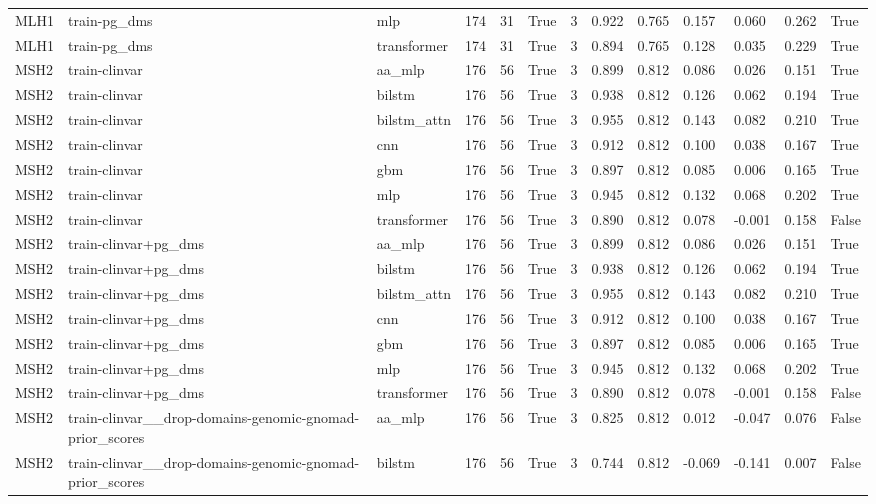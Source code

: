 \begin{table}[t]
\begin{tabular}{lllllllllllll}
MLH1 & train-pg\_dms & mlp & 174 & 31 & True & 3 & 0.922 & 0.765 & 0.157 & 0.060 & 0.262 & True \\
MLH1 & train-pg\_dms & transformer & 174 & 31 & True & 3 & 0.894 & 0.765 & 0.128 & 0.035 & 0.229 & True \\
MSH2 & train-clinvar & aa\_mlp & 176 & 56 & True & 3 & 0.899 & 0.812 & 0.086 & 0.026 & 0.151 & True \\
MSH2 & train-clinvar & bilstm & 176 & 56 & True & 3 & 0.938 & 0.812 & 0.126 & 0.062 & 0.194 & True \\
MSH2 & train-clinvar & bilstm\_attn & 176 & 56 & True & 3 & 0.955 & 0.812 & 0.143 & 0.082 & 0.210 & True \\
MSH2 & train-clinvar & cnn & 176 & 56 & True & 3 & 0.912 & 0.812 & 0.100 & 0.038 & 0.167 & True \\
MSH2 & train-clinvar & gbm & 176 & 56 & True & 3 & 0.897 & 0.812 & 0.085 & 0.006 & 0.165 & True \\
MSH2 & train-clinvar & mlp & 176 & 56 & True & 3 & 0.945 & 0.812 & 0.132 & 0.068 & 0.202 & True \\
MSH2 & train-clinvar & transformer & 176 & 56 & True & 3 & 0.890 & 0.812 & 0.078 & -0.001 & 0.158 & False \\
MSH2 & train-clinvar+pg\_dms & aa\_mlp & 176 & 56 & True & 3 & 0.899 & 0.812 & 0.086 & 0.026 & 0.151 & True \\
MSH2 & train-clinvar+pg\_dms & bilstm & 176 & 56 & True & 3 & 0.938 & 0.812 & 0.126 & 0.062 & 0.194 & True \\
MSH2 & train-clinvar+pg\_dms & bilstm\_attn & 176 & 56 & True & 3 & 0.955 & 0.812 & 0.143 & 0.082 & 0.210 & True \\
MSH2 & train-clinvar+pg\_dms & cnn & 176 & 56 & True & 3 & 0.912 & 0.812 & 0.100 & 0.038 & 0.167 & True \\
MSH2 & train-clinvar+pg\_dms & gbm & 176 & 56 & True & 3 & 0.897 & 0.812 & 0.085 & 0.006 & 0.165 & True \\
MSH2 & train-clinvar+pg\_dms & mlp & 176 & 56 & True & 3 & 0.945 & 0.812 & 0.132 & 0.068 & 0.202 & True \\
MSH2 & train-clinvar+pg\_dms & transformer & 176 & 56 & True & 3 & 0.890 & 0.812 & 0.078 & -0.001 & 0.158 & False \\
MSH2 & train-clinvar\_\_drop-domains-genomic-gnomad-prior\_scores & aa\_mlp & 176 & 56 & True & 3 & 0.825 & 0.812 & 0.012 & -0.047 & 0.076 & False \\
MSH2 & train-clinvar\_\_drop-domains-genomic-gnomad-prior\_scores & bilstm & 176 & 56 & True & 3 & 0.744 & 0.812 & -0.069 & -0.141 & 0.007 & False \\

\end{tabular}
\end{table}
